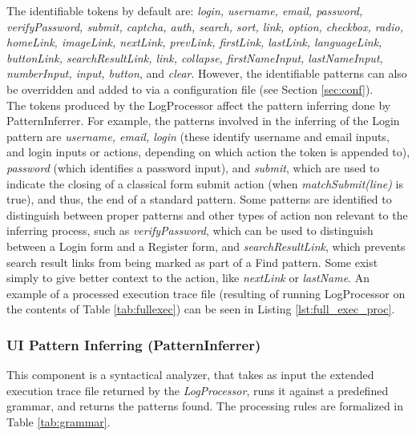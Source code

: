 The identifiable tokens by default are: \textit{login, username, email, password, verifyPassword, submit, captcha, auth, search, sort, link, option, checkbox, radio, homeLink, imageLink, nextLink, prevLink, firstLink, lastLink, languageLink, buttonLink, searchResultLink, link, collapse, firstNameInput, lastNameInput, numberInput, input, button}, and \textit{clear}. However, the identifiable patterns can also be overridden and added to via a configuration file (see Section \ref{sec:conf}).\\

The tokens produced by the LogProcessor affect the pattern inferring done by PatternInferrer. For example, the patterns involved in the inferring of the Login pattern are \textit{username, email, login} (these identify username and email inputs, and login inputs or actions, depending on which action the token is appended to), \textit{password} (which identifies a password input),  and \textit{submit}, which are used to indicate the closing of a classical form submit action (when \textit{matchSubmit(line)} is true), and thus, the end of a standard pattern. Some patterns are identified to distinguish between proper patterns and other types of action non relevant to the inferring process, such as \textit{verifyPassword}, which can be used to distinguish between a Login form and a Register form, and \textit{searchResultLink}, which prevents search result links from being marked as part of a Find pattern. Some exist simply to give better context to the action, like \textit{nextLink} or \textit{lastName}. An example of a processed execution trace file (resulting of running LogProcessor on the contents of Table \ref{tab:fullexec}) can be seen in Listing \ref{lst:full_exec_proc}.\\

\subsubsection{UI Pattern Inferring (PatternInferrer)}\label{sec:inf}

This component is a syntactical analyzer, that takes as input the extended execution trace file returned by the \textit{LogProcessor}, runs it against a predefined grammar, and returns the patterns found. The processing rules are formalized in Table \ref{tab:grammar}.

